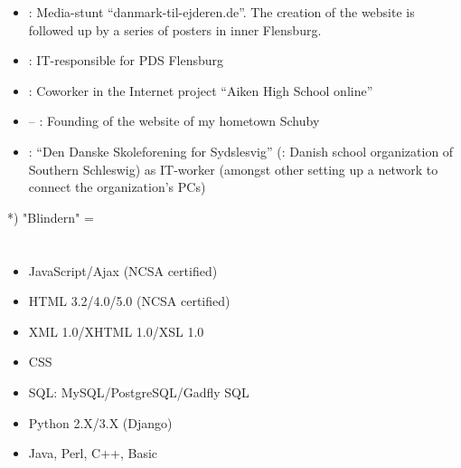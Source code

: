 \begin{itemize}
\item {}: Media-stunt “danmark-til-ejderen.de”. The creation of the website is followed up by a series of posters in inner Flensburg.
\item {}: IT-responsible for PDS Flensburg
\item {}: Coworker in the Internet project “Aiken High School online”
\item {} – : Founding of the website of my hometown Schuby
\item {}: “Den Danske Skoleforening for Sydslesvig” (\english: Danish school organization of Southern Schleswig) as IT-worker (amongst other setting up a network to connect the organization's PCs)


\end{itemize}



*) "Blindern" = \uio




\section*{\ITlanguages}

\begin{itemize}
\item JavaScript/Ajax (NCSA certified)
\item HTML 3.2/4.0/5.0 (NCSA certified)
\item XML 1.0/XHTML 1.0/XSL 1.0
\item CSS
\item SQL:  MySQL/PostgreSQL/Gadfly SQL
\item Python 2.X/3.X (Django)
\item \basic Java, Perl, C++, Basic
\end{itemize}

